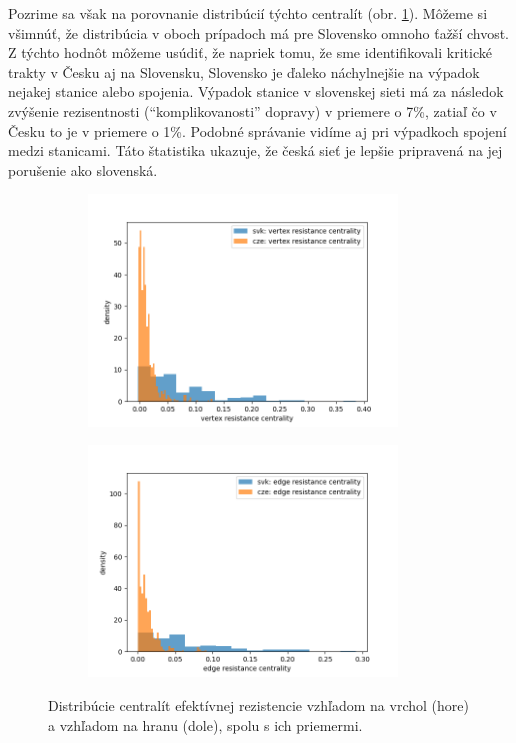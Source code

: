 \documentclass[main.tex]{subfiles}
\begin{document}
Pozrime sa však na porovnanie distribúcií týchto centralít (obr. \ref{fig:resistance_distr}). Môžeme si všimnúť, že distribúcia v oboch prípadoch má pre Slovensko omnoho ťažší chvost. Z týchto hodnôt môžeme usúdiť, že napriek tomu, že sme identifikovali kritické trakty v Česku aj na Slovensku, Slovensko je ďaleko náchylnejšie na výpadok nejakej stanice alebo spojenia. Výpadok stanice v slovenskej sieti má za následok zvýšenie rezisentnosti (\enquote{komplikovanosti} dopravy) v priemere o 7\%, zatiaľ čo v Česku to je v priemere o 1\%. Podobné správanie vidíme aj pri výpadkoch spojení medzi stanicami. Táto štatistika ukazuje, že česká sieť je lepšie pripravená na jej porušenie ako slovenská.

\begin{figure}
	\centering
	
	\begin{subfigure}{\linewidth}
		\centering
		\includegraphics[width=0.9\textwidth]{images/vertex_resistance_distribution.png}
	\end{subfigure}
	
	\vspace{0.5cm}
	
	\begin{subfigure}{\linewidth}
		\centering
		\includegraphics[width=0.9\textwidth]{images/edge_resistance_distribution.png}
	\end{subfigure}
	
	\caption{Distribúcie centralít efektívnej rezistencie vzhľadom na vrchol (hore) a vzhľadom na hranu (dole), spolu s ich priemermi.}
	\label{fig:resistance_distr}
\end{figure}






	
\end{document}
